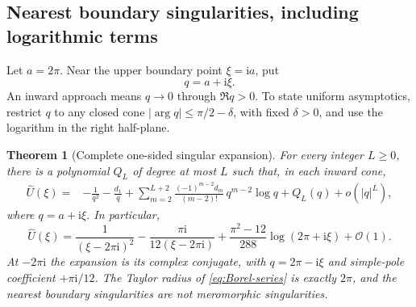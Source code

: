 \documentclass[11pt,a4paper]{article}
\newtheorem{theorem}{Theorem}[section]
\theoremstyle{definition}
\numberwithin{equation}{section}
\newcommand{\ii}{\mathrm{i}}
\newcommand{\Oh}{\mathcal O}
\begin{document}
\subsection{Nearest boundary singularities, including logarithmic terms}
Let $a=2\pi$. Near the upper boundary point $\xi=\ii a$, put
\begin{equation}
 q=a+\ii\xi.
 \label{eq:q-upper}
\end{equation}
An inward approach means $q\to0$ through $\Re q>0$. To state uniform asymptotics, restrict $q$ to any closed cone
$|\arg q|\le\pi/2-\delta$, with fixed $\delta>0$, and use the logarithm in the right half-plane.

\begin{theorem}[Complete one-sided singular expansion]
\label{thm:boundary}
For every integer $L\ge0$, there is a polynomial $Q_L$ of degree at most $L$ such that, in each inward cone,
\begin{align}
 \widehat U(\xi)={}&-\frac1{q^2}-\frac{d_1}{q}
   +\sum_{m=2}^{L+2}
       \frac{(-1)^{m-2}d_m}{(m-2)!}\,q^{m-2}\log q
   +Q_L(q)+o(|q|^L),
 \label{eq:boundary-all}
\end{align}
where $q=a+\ii\xi$. In particular,
\begin{equation}
 \widehat U(\xi)=\frac1{(\xi-2\pi\ii)^2}
 -\frac{\pi\ii}{12(\xi-2\pi\ii)}
 +\frac{\pi^2-12}{288}\log(2\pi+\ii\xi)+\Oh(1).
 \label{eq:boundary-first}
\end{equation}
At $-2\pi\ii$ the expansion is its complex conjugate, with
$q=2\pi-\ii\xi$ and simple-pole coefficient $+\pi\ii/12$.
The Taylor radius of \eqref{eq:Borel-series} is exactly $2\pi$, and the nearest boundary singularities are not meromorphic singularities.
\end{theorem}
\end{document}
